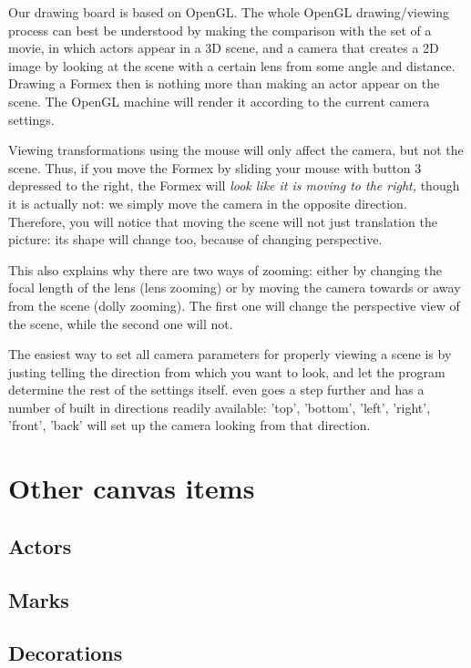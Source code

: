Our drawing board is based on OpenGL. The whole OpenGL drawing/viewing process can best be understood by making the comparison with the set of a movie, in which actors appear in a 3D scene, and a camera that creates a 2D image by looking at the scene with a certain lens from some angle and distance. Drawing a Formex then is nothing more than making an actor appear on the scene. The OpenGL machine will render it according to the current camera settings. 

Viewing transformations using the mouse will only affect the camera, but not the scene. Thus, if you move the Formex by sliding your mouse with button 3 depressed to the right, the Formex will \emph{look like it is moving to the right,} though it is actually not: we simply move the camera in the opposite direction. Therefore, you will notice that moving the scene will not just translation the picture: its shape will change too, because of changing perspective.

This also explains why there are two ways of zooming: either by changing the focal length of the lens (lens zooming) or by moving the camera towards or away from the scene (dolly zooming). The first one will change the perspective view of the scene, while the second one will not. 

The easiest way to set all camera parameters for properly viewing a scene is by justing telling the direction from which you want to look, and let the program determine the rest of the settings itself. \pyformex even goes a step further and has a number of built in directions readily available: 'top', 'bottom', 'left', 'right', 'front', 'back' will set up the camera looking from that direction.

\section{Other canvas items}


\subsection{Actors}

\subsection{Marks}

\subsection{Decorations}
  


